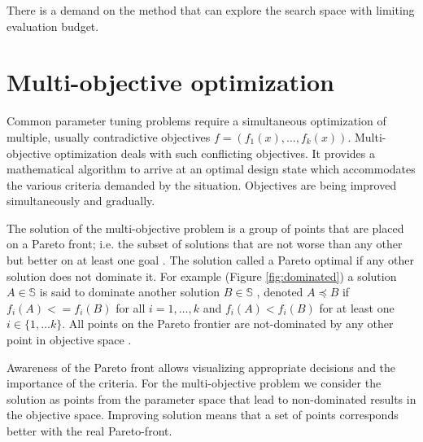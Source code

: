         There is a demand on the method that can explore the search space with limiting evaluation budget. 
    

    \section{Multi-objective optimization}
        Common parameter tuning problems require a simultaneous optimization of multiple, usually contradictive objectives $f = (f_1(x), \ldots, f_k(x))$. Multi-objective optimization deals with such conflicting objectives. It provides a mathematical algorithm to arrive at an optimal design state which accommodates the various criteria demanded by the situation. Objectives are being improved simultaneously and gradually.

        The solution of the multi-objective problem is a group of points that are placed on a Pareto front; i.e. the subset of solutions that are not worse than any other but better on at least one goal \cite{KrallMD15}. The solution called a Pareto optimal if any other solution does not dominate it. For example (Figure \ref{fig:dominated}) a solution $A \in \mathbb{S}$ is said to dominate another solution $B \in \mathbb{S}$ , denoted $A \preceq B$ if $f_i(A)<=f_i(B)$ for all $i=1, \ldots ,k$ and $f_i(A)<f_i(B)$ for at least one $i \in \{1, \ldots k\}$. All points on the Pareto frontier are not-dominated by any other point in objective space \cite{Kaisa0021267}.  

        Awareness of the Pareto front allows visualizing appropriate decisions and the importance of the criteria. For the multi-objective problem we consider the solution as points from the parameter space that lead to non-dominated results in the objective space. Improving solution means that a set of points corresponds better with the real Pareto-front.

